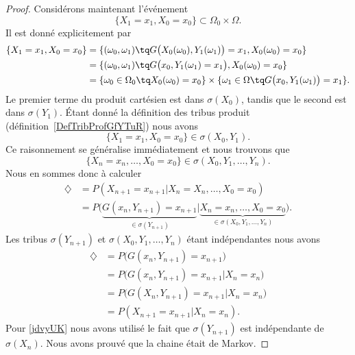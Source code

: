 \begin{proof}
	Considérons maintenant l'événement
	\begin{equation}
		\{ X_1=x_1,X_0=x_0 \}\subset \Omega_0\times \Omega.
	\end{equation}
	Il est donné explicitement par
	\begin{subequations}
		\begin{align}
			\{ X_1=x_1,X_0=x_0 \} & =\{ (\omega_0,\omega_1)\tq G\big( X_0(\omega_0),Y_1(\omega_1)\big)=x_1,X_0(\omega_0)=x_0  \}                           \\
			                      & =\{ (\omega_0,\omega_1)\tq G\big( x_0,Y_1(\omega_1)=x_1\big),X_0(\omega_0)=x_0  \}                                     \\
			                      & =\{ \omega_0\in \Omega_0\tq X_0(\omega_0)=x_0 \}\times \{ \omega_1\in \Omega\tq G\big( x_0,Y_1(\omega_1)\big)=x_1  \}.
		\end{align}
	\end{subequations}
	Le premier terme du produit cartésien est dans \( \sigma(X_0)\), tandis que le second est dans \( \sigma(Y_1)\). Étant donné la définition des tribus produit (définition~\ref{DefTribProfGfYTuR}) nous avons
	\begin{equation}
		\{ X_1=x_1,X_0=x_0 \}\in\sigma(X_0,Y_1).
	\end{equation}
	Ce raisonnement se généralise immédiatement et nous trouvons que
	\begin{equation}
		\{ X_n=x_n,\ldots, X_0=x_0 \}\in\sigma(X_0,Y_1,\ldots, Y_n).
	\end{equation}
	Nous en sommes donc à calculer
	\begin{subequations}
		\begin{align}
			\diamondsuit & =P(X_{n+1}=x_{n+1}|X_n=X_n,\ldots, X_0=x_0)                                                                                                    \\
			             & =P\big( \underbrace{G(x_n,Y_{n+1})=x_{n+1}}_{\in\sigma(Y_{n+1})}|\underbrace{X_n=x_n,\ldots, X_0=x_0}_{\in\sigma (X_0,Y_1,\ldots, Y_n)} \big).
		\end{align}
	\end{subequations}
	Les tribus \( \sigma(Y_{n+1})\) et \( \sigma(X_0,Y_1,\ldots, Y_n)\) étant indépendantes nous avons
	\begin{subequations}
		\begin{align}
			\diamondsuit & =P\big( G(x_n,Y_{n+1})=x_{n+1} \big)                              \\
			             & =P\big( G(x_n,Y_{n+1})=x_{n+1}|X_n=x_n \big)       \label{jdvyUK} \\
			             & =P\big( G(X_n,Y_{n+1})=x_{n+1}|X_n=x_n \big)                      \\
			             & =P(X_{n+1}=x_{n+1}|X_n=x_n).
		\end{align}
	\end{subequations}
	Pour \eqref{jdvyUK} nous avons utilisé le fait que \( \sigma(Y_{n+1})\) est indépendante de \( \sigma(X_n)\). Nous avons prouvé que la chaine était de Markov.
\end{proof}

